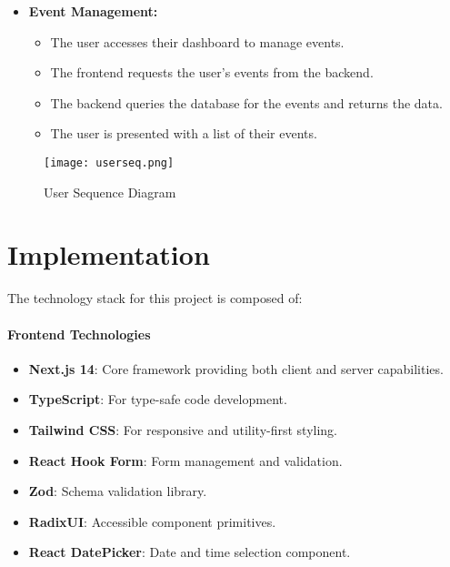 \begin{itemize}
    \item \textbf{Event Management:}
    \begin{itemize}
        \item The user accesses their dashboard to manage events.
        \item The frontend requests the user's events from the backend.
        \item The backend queries the database for the events and returns the data.
        \item The user is presented with a list of their events.
    \end{itemize}
\end{itemize}


\begin{figure}[H]
	\centering	\texttt{[image: userseq.png]}
    \caption{User Sequence Diagram}
    \end{figure}




\section{Implementation}

The technology stack for this project is composed of:

\paragraph{Frontend Technologies}
\begin{itemize}
    \item \textbf{Next.js 14}: Core framework providing both client and server capabilities.
    \item \textbf{TypeScript}: For type-safe code development.
    \item \textbf{Tailwind CSS}: For responsive and utility-first styling.
    \item \textbf{React Hook Form}\cite{reacthookform}: Form management and validation.
    \item \textbf{Zod}\cite{zod}: Schema validation library.
    \item \textbf{RadixUI}\cite{radixui}: Accessible component primitives.
    \item \textbf{React DatePicker}\cite{reactdatepicker}: Date and time selection component.
\end{itemize}

